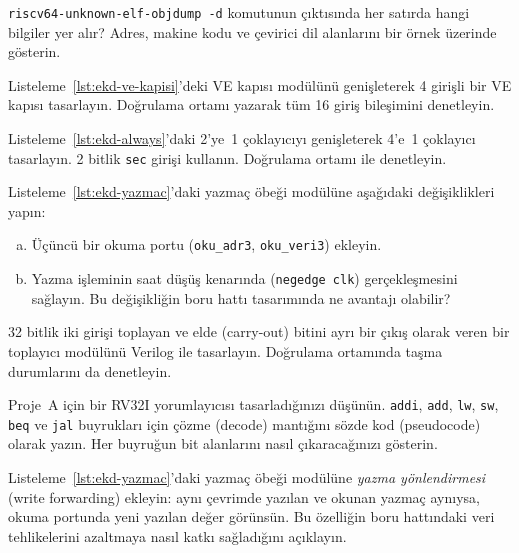 \begin{alistirma}[\kolay]
\texttt{riscv64-unknown-elf-objdump -d} komutunun çıktısında her satırda hangi bilgiler yer alır? Adres, makine kodu ve çevirici dil alanlarını bir örnek üzerinde gösterin.
\end{alistirma}

\begin{alistirma}[\orta]
Listeleme~\ref{lst:ekd-ve-kapisi}'deki VE kapısı modülünü genişleterek 4 girişli bir VE kapısı tasarlayın. Doğrulama ortamı yazarak tüm 16 giriş bileşimini denetleyin.
\end{alistirma}

\begin{alistirma}[\orta]
Listeleme~\ref{lst:ekd-always}'daki 2'ye~1 çoklayıcıyı genişleterek 4'e~1 çoklayıcı tasarlayın. 2 bitlik \texttt{sec} girişi kullanın. Doğrulama ortamı ile denetleyin.
\end{alistirma}

\begin{alistirma}[\orta]
Listeleme~\ref{lst:ekd-yazmac}'daki yazmaç öbeği modülüne aşağıdaki değişiklikleri yapın:
\begin{enumerate}[(a)]
\item Üçüncü bir okuma portu (\texttt{oku\_adr3}, \texttt{oku\_veri3}) ekleyin.
\item Yazma işleminin saat düşüş kenarında (\texttt{negedge clk}) gerçekleşmesini sağlayın. Bu değişikliğin boru hattı tasarımında ne avantajı olabilir?
\end{enumerate}
\end{alistirma}

\begin{alistirma}[\orta]
32 bitlik iki girişi toplayan ve elde (carry-out) bitini ayrı bir çıkış olarak veren bir toplayıcı modülünü Verilog ile tasarlayın. Doğrulama ortamında taşma durumlarını da denetleyin.
\end{alistirma}

\begin{alistirma}[\orta]
Proje~A için bir RV32I yorumlayıcısı tasarladığınızı düşünün. \texttt{addi}, \texttt{add}, \texttt{lw}, \texttt{sw}, \texttt{beq} ve \texttt{jal} buyrukları için çözme (decode) mantığını sözde kod (pseudocode) olarak yazın. Her buyruğun bit alanlarını nasıl çıkaracağınızı gösterin.
\end{alistirma}

\begin{alistirma}[\zor]
Listeleme~\ref{lst:ekd-yazmac}'daki yazmaç öbeği modülüne \emph{yazma yönlendirmesi} (write forwarding) ekleyin: aynı çevrimde yazılan ve okunan yazmaç aynıysa, okuma portunda yeni yazılan değer görünsün. Bu özelliğin boru hattındaki veri tehlikelerini azaltmaya nasıl katkı sağladığını açıklayın.
\end{alistirma}

